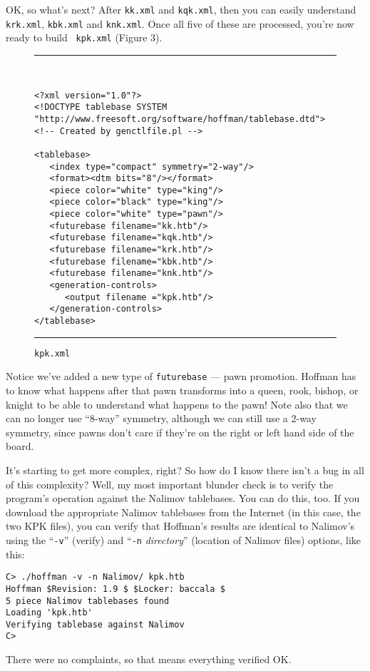 \documentclass[11pt]{article}
\begin{document}
OK, so what's next?  After {\tt kk.xml} and {\tt kqk.xml}, then you
can easily understand {\tt krk.xml}, {\tt kbk.xml} and {\tt knk.xml}.
Once all five of these are processed, you're now ready to build {\tt
kpk.xml} (Figure 3).

\begin{figure}
\hrule\ 
{\small\begin{verbatim}
<?xml version="1.0"?>
<!DOCTYPE tablebase SYSTEM "http://www.freesoft.org/software/hoffman/tablebase.dtd">
<!-- Created by genctlfile.pl -->

<tablebase>
   <index type="compact" symmetry="2-way"/>
   <format><dtm bits="8"/></format>
   <piece color="white" type="king"/>
   <piece color="black" type="king"/>
   <piece color="white" type="pawn"/>
   <futurebase filename="kk.htb"/>
   <futurebase filename="kqk.htb"/>
   <futurebase filename="krk.htb"/>
   <futurebase filename="kbk.htb"/>
   <futurebase filename="knk.htb"/>
   <generation-controls>
      <output filename ="kpk.htb"/>
   </generation-controls>
</tablebase>
\end{verbatim}}
\hrule
\caption{\tt kpk.xml}
\end{figure}

Notice we've added a new type of {\tt futurebase} --- pawn promotion.
Hoffman has to know what happens after that pawn transforms into a
queen, rook, bishop, or knight to be able to understand what happens
to the pawn!  Note also that we can no longer use ``8-way'' symmetry,
although we can still use a 2-way symmetry, since pawns don't care if
they're on the right or left hand side of the board.

It's starting to get more complex, right?  So how do I know there
isn't a bug in all of this complexity?  Well, my most important
blunder check is to verify the program's operation against the Nalimov
tablebases.  You can do this, too.  If you download the appropriate
Nalimov tablebases from the Internet (in this case, the two KPK
files), you can verify that Hoffman's results are identical to
Nalimov's using the ``{\tt -v}'' (verify) and ``{\tt -n} {\it
directory}'' (location of Nalimov files) options, like this:

\begin{verbatim}
C> ./hoffman -v -n Nalimov/ kpk.htb
Hoffman $Revision: 1.9 $ $Locker: baccala $
5 piece Nalimov tablebases found
Loading 'kpk.htb'
Verifying tablebase against Nalimov
C>
\end{verbatim}

There were no complaints, so that means everything verified OK.
\end{document}
